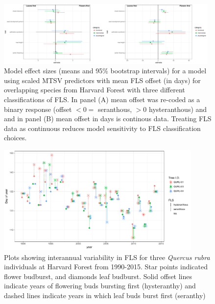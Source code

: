\documentclass{article}\usepackage[]{graphicx}\usepackage[]{color}
\begin{document}
\begin{center}
\begin{figure}[here]
\includegraphics[width=0.98\textwidth]{..//figures/HF_con_v_bin_comp.pdf} %
\caption{Model effect sizes (means and 95\% bootstrap intervals) for a model using scaled MTSV predictors with mean FLS offset (in days) for overlapping species from Harvard Forest with three different classifications of FLS. In panel (A) mean offset was re-coded as a binary response (offset $<0 =$ seranthous, $>0$ hysteranthous) and and in panel (B) mean offset in days is continous data. Treating FLS data as continuous reduces model sensitivity to FLS classification choices.}
\label{fig:Figure 2}
\end{figure}

\end{center}
\begin{center}
\begin{figure}[here]
\includegraphics[width=0.9\textwidth]{..//figures/HF_dissplot.pdf} %
\caption{Plots showing interannual variability in FLS for three \textit{Quercus rubra} individuals at Harvard Forest from 1990-2015. Star points indicated flower budburst, and diamonds leaf budburst. Solid offset lines indicate years of flowering buds bursting first (hysteranthy) and dashed lines indicate years in which leaf buds burst first (seranthy)}
\label{fig:Figure 3}
\end{figure}
\end{center}
\end{document}
